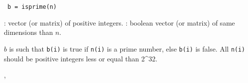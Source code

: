 
\begin{mandesc}
\end{mandesc}

\begin{calling_sequence}
\begin{verbatim}
 b = isprime(n)
\end{verbatim}
\end{calling_sequence}

\begin{parameters}
  \begin{varlist}
   : vector (or matrix) of positive integers.
   : boolean vector (or matrix) of same dimensions than $n$.
  \end{varlist}
\end{parameters}

\begin{mandescription}
  $b$ is such that \verb+b(i)+ is true if \verb+n(i)+ is a prime
  number, else  \verb+b(i)+ is false. All \verb+n(i)+ should be 
  positive integers less or equal than 2^32.

\end{mandescription}

\begin{examples}
\begin{program}
\end{program}
\end{examples}


\begin{manseealso}
, 
\end{manseealso}


